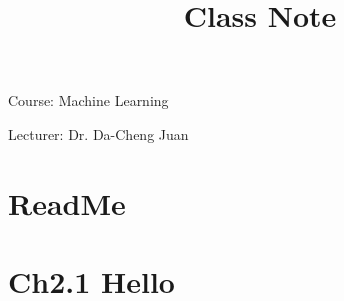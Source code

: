 \documentclass{article}
\begin{document}
\title{Class Note}
\Large{Course: Machine Learning}

\Large{Lecturer: Dr. Da-Cheng Juan}
\section{ReadMe}
\label{ReadMe}

\section{Ch2.1 Hello}
\label{Ch2.1}

\end{document}
